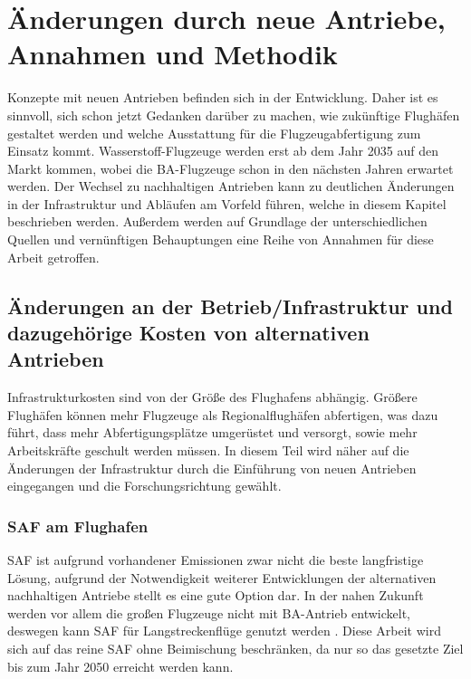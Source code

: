 \chapter{Änderungen durch neue Antriebe, Annahmen und Methodik}
\label{ch:Änderungen durch neue Antriebe, Annahmen und Methodik}

Konzepte mit neuen Antrieben befinden sich in der Entwicklung.
Daher ist es sinnvoll, sich schon jetzt Gedanken darüber zu machen,
wie zukünftige Flughäfen gestaltet werden und welche Ausstattung für 
die Flugzeugabfertigung zum Einsatz kommt. 
Wasserstoff-Flugzeuge werden erst ab dem Jahr 2035 auf den Markt kommen, 
wobei die BA-Flugzeuge schon in den nächsten Jahren erwartet werden.
Der Wechsel zu nachhaltigen Antrieben kann zu deutlichen Änderungen 
in der Infrastruktur und Abläufen am Vorfeld führen, 
welche in diesem Kapitel beschrieben werden.
Außerdem werden auf Grundlage der unterschiedlichen Quellen und 
vernünftigen Behauptungen eine Reihe von Annahmen für diese Arbeit getroffen.
%

\section{Änderungen an der Betrieb/Infrastruktur und dazugehörige Kosten von alternativen Antrieben}
\label{s:Änderungen an der Abfertigung und dazugehörige Kosten von alternativen Antrieben}

Infrastrukturkosten sind von der Größe des Flughafens abhängig. 
Größere Flughäfen können mehr Flugzeuge als Regionalflughäfen abfertigen, 
was dazu führt, dass mehr Abfertigungsplätze umgerüstet und versorgt, 
sowie mehr Arbeitskräfte geschult werden müssen. 
In diesem Teil wird näher auf die Änderungen der Infrastruktur durch 
die Einführung von neuen Antrieben eingegangen und die Forschungsrichtung gewählt.

\subsection{SAF am Flughafen}
SAF ist aufgrund vorhandener Emissionen zwar nicht die beste langfristige Lösung, 
aufgrund der Notwendigkeit weiterer Entwicklungen der alternativen nachhaltigen 
Antriebe stellt es eine gute Option dar. 
In der nahen Zukunft werden vor allem die großen Flugzeuge nicht mit BA-Antrieb entwickelt, 
deswegen kann SAF für Langstreckenflüge genutzt werden \cite{dalmia2022powering}.
Diese Arbeit wird sich auf das reine SAF ohne Beimischung beschränken, 
da nur so das gesetzte Ziel bis zum Jahr 2050 erreicht werden kann.


